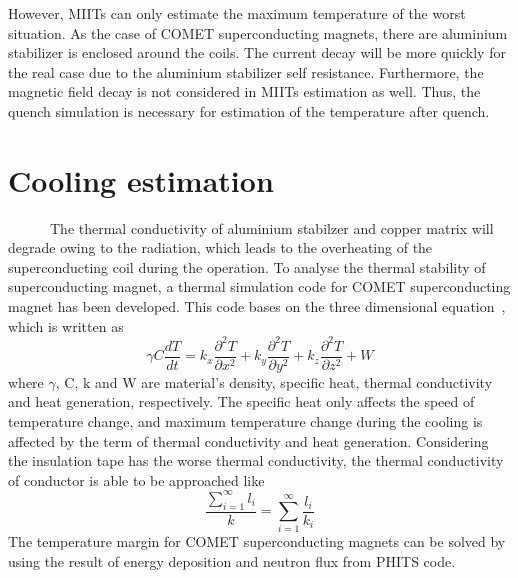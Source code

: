 However, MIITs can only estimate the maximum temperature of the worst situation.
As the case of COMET superconducting magnets, there are aluminium stabilizer is enclosed around the coils.
The current decay will be more quickly for the real case due to the aluminium stabilizer self resistance.
Furthermore, the magnetic field decay is not considered in MIITs estimation as well.
Thus, the quench simulation is necessary for estimation of the temperature after quench.


 \section{Cooling estimation}
~~~~~~The thermal conductivity of aluminium stabilzer and copper matrix will degrade owing to the radiation, which leads to the overheating of the superconducting coil during the operation.
To analyse the thermal stability of superconducting magnet, a thermal simulation code for COMET superconducting magnet has been developed.
This code bases on the three dimensional equation~\cite{heat}, which is written as
\begin{equation}
 \gamma C \frac{dT}{dt} = k_x \frac{\partial^2 T}{\partial x^2} + k_y \frac{\partial^2 T}{\partial y^2} + k_z \frac{\partial^2 T}{\partial z^2} + W
\end{equation}
where $\gamma$, C, k and W are material's density, specific heat, thermal conductivity and heat generation, respectively.
The specific heat only affects the speed of temperature change, and maximum temperature change during the cooling is affected by the term of thermal conductivity and heat generation.
Considering the insulation tape has the worse thermal conductivity, the thermal conductivity of conductor is able to be approached like
\begin{equation}
 \frac{\sum^{\infty}_{i=1}l_i}{k} = \sum^{\infty}_{i=1} \frac{l_i}{k_i}
\end{equation}
The temperature margin for COMET superconducting magnets can be solved by using the result of energy deposition and neutron flux from PHITS code.

